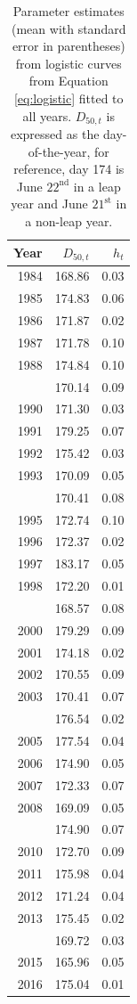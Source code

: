 \documentclass[12pt,]{book}
\theoremstyle{definition}
\theoremstyle{definition}
\theoremstyle{definition}
\theoremstyle{remark}
\begin{document}
\begin{singlespace}

\begin{table}

\caption{\label{tab:rt-ests-table}Parameter estimates (mean with standard error in parentheses) from logistic curves from Equation \ref{eq:logistic} fitted to all years. $D_{50,t}$ is expressed as the day-of-the-year, for reference, day 174 is June $22^{\text{nd}}$ in a leap year and June $21^{\text{st}}$ in a non-leap year.}
\centering
\begin{tabular}[t]{rrr}
\toprule
Year & $D_{50,t}$ & $h_t$\\
\midrule
1984 & 168.86 & 0.03\\
1985 & 174.83 & 0.06\\
1986 & 171.87 & 0.02\\
1987 & 171.78 & 0.10\\
1988 & 174.84 & 0.10\\
\addlinespace
1989 & 170.14 & 0.09\\
1990 & 171.30 & 0.03\\
1991 & 179.25 & 0.07\\
1992 & 175.42 & 0.03\\
1993 & 170.09 & 0.05\\
\addlinespace
1994 & 170.41 & 0.08\\
1995 & 172.74 & 0.10\\
1996 & 172.37 & 0.02\\
1997 & 183.17 & 0.05\\
1998 & 172.20 & 0.01\\
\addlinespace
1999 & 168.57 & 0.08\\
2000 & 179.29 & 0.09\\
2001 & 174.18 & 0.02\\
2002 & 170.55 & 0.09\\
2003 & 170.41 & 0.07\\
\addlinespace
2004 & 176.54 & 0.02\\
2005 & 177.54 & 0.04\\
2006 & 174.90 & 0.05\\
2007 & 172.33 & 0.07\\
2008 & 169.09 & 0.05\\
\addlinespace
2009 & 174.90 & 0.07\\
2010 & 172.70 & 0.09\\
2011 & 175.98 & 0.04\\
2012 & 171.24 & 0.04\\
2013 & 175.45 & 0.02\\
\addlinespace
2014 & 169.72 & 0.03\\
2015 & 165.96 & 0.05\\
2016 & 175.04 & 0.01\\
\bottomrule
\end{tabular}
\end{table}

\end{singlespace}
\end{document}
